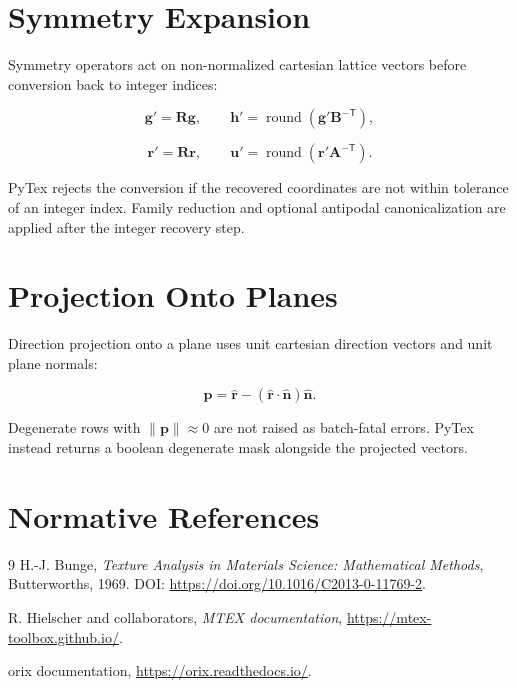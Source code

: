\documentclass[11pt]{article}
\begin{document}
\section{Symmetry Expansion}

Symmetry operators act on non-normalized cartesian lattice vectors before conversion back to integer
indices:

\[
\mathbf{g}' = \mathbf{R}\mathbf{g}, \qquad
\mathbf{h}' = \operatorname{round}\!\left(\mathbf{g}'\mathbf{B}^{- \mathsf{T}}\right),
\]

\[
\mathbf{r}' = \mathbf{R}\mathbf{r}, \qquad
\mathbf{u}' = \operatorname{round}\!\left(\mathbf{r}'\mathbf{A}^{- \mathsf{T}}\right).
\]

PyTex rejects the conversion if the recovered coordinates are not within tolerance of an integer
index. Family reduction and optional antipodal canonicalization are applied after the integer
recovery step.

\section{Projection Onto Planes}

Direction projection onto a plane uses unit cartesian direction vectors and unit plane normals:

\[
\mathbf{p} = \hat{\mathbf{r}} - (\hat{\mathbf{r}} \cdot \hat{\mathbf{n}})\hat{\mathbf{n}}.
\]

Degenerate rows with $\lVert \mathbf{p} \rVert \approx 0$ are not raised as batch-fatal errors.
PyTex instead returns a boolean degenerate mask alongside the projected vectors.

\section{Normative References}

\begin{thebibliography}{9}
H.-J. Bunge,
\textit{Texture Analysis in Materials Science: Mathematical Methods},
Butterworths, 1969.
DOI: \url{https://doi.org/10.1016/C2013-0-11769-2}.

R. Hielscher and collaborators,
\textit{MTEX documentation},
\url{https://mtex-toolbox.github.io/}.

orix documentation,
\url{https://orix.readthedocs.io/}.
\end{thebibliography}
\end{document}
